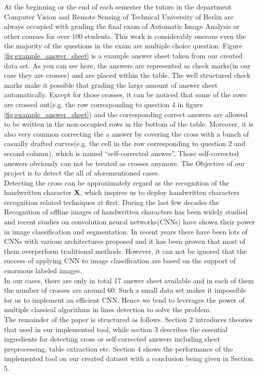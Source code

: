 \documentclass[a4paper,twoside]{article}
\begin{document}
\noindent At the beginning or the end of each semester the tutors in the department Computer Vision and Remote Sensing of Technical University of Berlin are always occupied with grading the final exam of Automatic Image Analysis or other courses for over 100 students. This work is considerably onerous even the the majority of the questions in the exam are multiple choice question. Figure \ref{fig:example_answer_sheet} is a example answer sheet taken from our created data set. As you can see here, the answers are represented as check marks(in our case they are crosses) and are placed within the table. The well structured check marks make it possible that grading the large amount of answer sheet automatically. Except for those crosses, it can be noticed that some of the rows are crossed out(e.g. the row corresponding to question 4 in figure \ref{fig:example_answer_sheet}) and the corresponding correct answers are allowed to be written in the non-occupied rows in the bottom of the table. Moreover, it is also very common correcting the a answer by covering the cross with a bunch of casually drafted curves(e.g. the cell in the row corresponding to question 2 and second column), which is named “self-corrected answer”. Those self-corrected answers obviously can not be treated as crosses anymore. The Objective of our project is to detect the all of aforementioned cases.\\
Detecting the cross can be approximately regard as the recognition of the handwritten character \textbf{X}, which inspires us to deploy handwritten characters recognition related techniques at first. During the last few decades the Recognition of offline images of handwritten characters has been widely studied \cite{arica2001overview} and recent studies on convolution neural networks(CNNs) have shown their power in image classification and segmentation. In recent years there have been lots of CNNs with various architectures proposed and it has been proven that most of them overperform  traditional methods. However, it can not be ignored that the success of applying CNN to image classification are based on the support of enormous labeled images.\\
In our cases, there are only in total 17 answer sheet available and in each of them the number of crosses are around 60. Such a small data set makes it impossible for us to implement an efficient CNN. Hence we tend to leverages the power of multiple classical algorithms in lines detection to solve the problem.\\
The remainder of the paper is structured as follows. Section 2 introduces theories that used in our implemented tool, while section 3 describes the essential ingredients for detecting cross or self-corrected answers including sheet preprocessing, table extraction etc. Section 4 shows the performance of the implemented tool on our created dataset with a conclusion being given in Section 5. 
\end{document}
